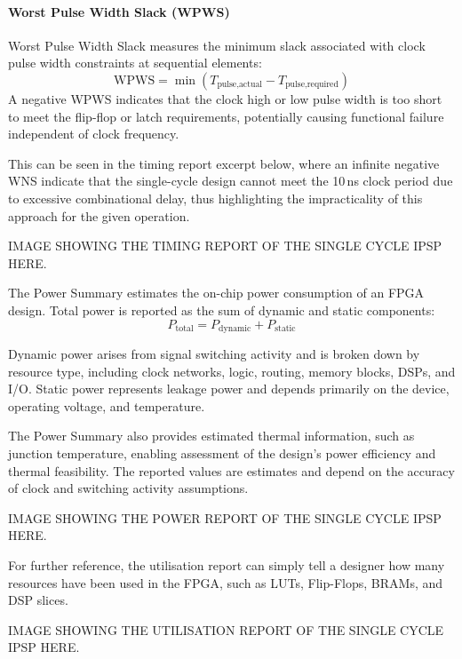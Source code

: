 \documentclass[a4paper,12pt]{article}
\begin{document}
\paragraph{Worst Pulse Width Slack (WPWS)}
Worst Pulse Width Slack measures the minimum slack associated with clock pulse width constraints at sequential elements:
\[
\text{WPWS} = \min \left( T_{\text{pulse,actual}} - T_{\text{pulse,required}} \right)
\]
A negative WPWS indicates that the clock high or low pulse width is too short to meet the flip-flop or latch requirements, potentially causing functional failure independent of clock frequency.

This can be seen in the timing report excerpt below, where an infinite negative WNS indicate that the single-cycle design cannot meet the 10\,ns clock period due to excessive combinational delay, thus highlighting the impracticality of this approach for the given operation.

\begin{large}
    IMAGE SHOWING THE TIMING REPORT OF THE SINGLE CYCLE IPSP HERE.
\end{large}

The Power Summary estimates the on-chip power consumption of an FPGA design. Total power is reported as the sum of dynamic and static components:
\[
P_{\text{total}} = P_{\text{dynamic}} + P_{\text{static}}
\]

Dynamic power arises from signal switching activity and is broken down by resource type, including clock networks, logic, routing, memory blocks, DSPs, and I/O. Static power represents leakage power and depends primarily on the device, operating voltage, and temperature.

The Power Summary also provides estimated thermal information, such as junction temperature, enabling assessment of the design’s power efficiency and thermal feasibility. The reported values are estimates and depend on the accuracy of clock and switching activity assumptions.

\begin{large}
    IMAGE SHOWING THE POWER REPORT OF THE SINGLE CYCLE IPSP HERE.
\end{large}

For further reference, the utilisation report can simply tell a designer how many resources have been used in the FPGA, such as LUTs, Flip-Flops, BRAMs, and DSP slices.

\begin{large}
    IMAGE SHOWING THE UTILISATION REPORT OF THE SINGLE CYCLE IPSP HERE.
\end{large}
\end{document}
